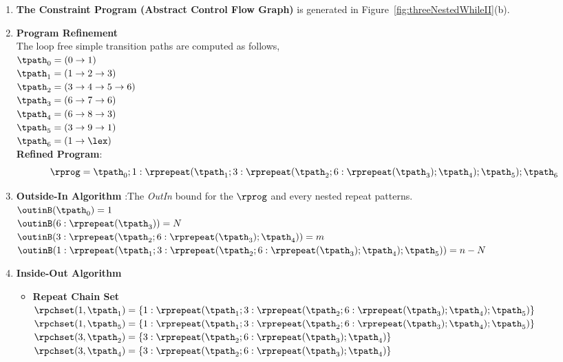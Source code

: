 \begin{enumerate}
  \item  \textbf{The Constraint Program (Abstract Control Flow Graph)} is generated in Figure~\ref{fig:threeNestedWhileII}(b).

  \item \textbf{Program Refinement}
\\
The loop free simple transition paths are computed as follows,
\\
$\tpath_0 = (0 \to 1)$
\\
$\tpath_1 = (1 \to 2 \to 3)$
\\
$\tpath_2 = (3 \to 4 \to 5 \to 6)$
\\
$\tpath_3 = (6 \to 7 \to 6)$
\\
$\tpath_4 = (6 \to 8 \to 3)$
\\
$\tpath_5 = (3 \to 9 \to 1)$
\\
$\tpath_6 = (1 \to \lex)$
\\
\textbf{Refined Program}:
\[
  \rprog = \tpath_0 ; 1: \rprepeat(\tpath_1; 3: \rprepeat(\tpath_2; 6 : \rprepeat(\tpath_3); \tpath_4); \tpath_5); \tpath_6
\]
\item \textbf{Outside-In Algorithm} :The \emph{OutIn} bound for the $\rprog$ and every nested repeat patterns.
\\
$\outinB(\tpath_0) = 1$
\\
$\outinB(6 : \rprepeat(\tpath_3)) = N $
\\
$\outinB(3: \rprepeat(\tpath_2; 6 : \rprepeat(\tpath_3); \tpath_4)) = m $
\\
$\outinB(1: \rprepeat(\tpath_1; 3: \rprepeat(\tpath_2; 6 : \rprepeat(\tpath_3); \tpath_4); \tpath_5)) = n - N $
\item \textbf{Inside-Out Algorithm}
\begin{itemize}
    \item \textbf{Repeat Chain Set}
    \\
    $\rpchset(1, \tpath_1) = \{1: \rprepeat(\tpath_1; 3: \rprepeat(\tpath_2; 6 : \rprepeat(\tpath_3); \tpath_4); \tpath_5)\}$
    \\
    $\rpchset(1, \tpath_5) = \{1: \rprepeat(\tpath_1; 3: \rprepeat(\tpath_2; 6 : \rprepeat(\tpath_3); \tpath_4); \tpath_5)\}$
    \\
    $\rpchset(3, \tpath_2) = \{3: \rprepeat(\tpath_2; 6 : \rprepeat(\tpath_3); \tpath_4)\}$
    \\
    $\rpchset(3, \tpath_4) = \{3: \rprepeat(\tpath_2; 6 : \rprepeat(\tpath_3); \tpath_4)\}$
    \\

\end{itemize}
\end{enumerate}
